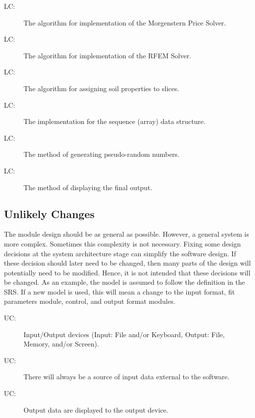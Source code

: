 \documentclass[12pt]{article}
\newcounter{lcnum}
\newcommand{\lcthelcnum}{LC\thelcnum}
\newcounter{ucnum}
\newcommand{\uctheucnum}{UC\theucnum}
\begin{document}
\begin{description}
\item[\lcthelcnum\label{LC:mp}:]The algorithm for implementation of the Morgenstern Price Solver.
\end{description}
\begin{description}
\item[\lcthelcnum\label{LC:rfem}:]The algorithm for implementation of the RFEM Solver.
\end{description}
\begin{description}
\item[\lcthelcnum\label{LC:prop}:]The algorithm for assigning soil properties to slices.
\end{description}
\begin{description}
\item[\lcthelcnum\label{LC:array}:]The implementation for the sequence (array) data structure.
\end{description}
\begin{description}
\item[\lcthelcnum\label{LC:rand}:]The method of generating pseudo-random numbers.
\end{description}
\begin{description}
\item[\lcthelcnum\label{LC:plot}:]The method of displaying the final output.
\end{description}
\subsection{Unlikely Changes}
\label{Sec:UnliChan}
The module design should be as general as possible. However, a general system is more complex. Sometimes this complexity is not necessary. Fixing some design decisions at the system architecture stage can simplify the software design. If these decision should later need to be changed, then many parts of the design will potentially need to be modified. Hence, it is not intended that these decisions will be changed.  As an example, the model is assumed to follow the definition in the SRS.  If a new model is used, this will mean a change to the input format, fit parameters module, control, and output format modules.
\begin{description}
\item[\uctheucnum\label{UC:IO}:]Input/Output devices (Input: File and/or Keyboard, Output: File, Memory, and/or Screen).
\end{description}
\begin{description}
\item[\uctheucnum\label{UC:inputsource}:]There will always be a source of input data external to the software.
\end{description}
\begin{description}
\item[\uctheucnum\label{UC:output}:]Output data are displayed to the output device.
\end{description}
\end{document}
